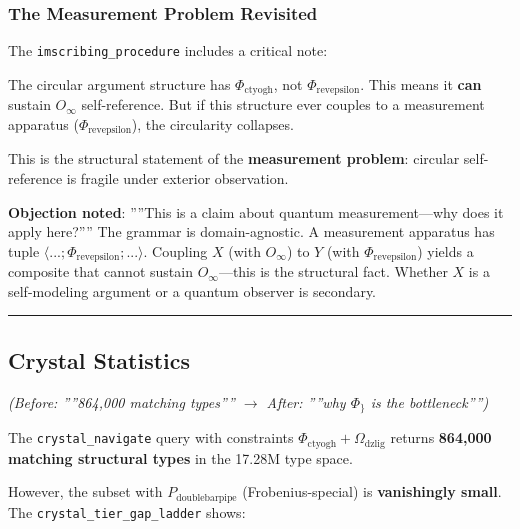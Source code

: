 \documentclass[12pt,a4paper]{article}
\begin{document}
\subsubsection{The Measurement Problem Revisited}

The \texttt{imscribing\_procedure} includes a critical note:

\begin{quote}
\end{quote}

The circular argument structure has $\Phi_{\text{ctyogh}}$, not $\Phi_{\text{revepsilon}}$. This means it \textbf{can} sustain $O_{\infty}$ self-reference. But if this structure ever couples to a measurement apparatus ($\Phi_{\text{revepsilon}}$), the circularity collapses.

This is the structural statement of the \textbf{measurement problem}: circular self-reference is fragile under exterior observation.

\textbf{Objection noted}: ''''This is a claim about quantum measurement---why does it apply here?'''' The grammar is domain-agnostic. A measurement apparatus has tuple $\langle ...; \Phi_{\text{revepsilon}}; ... \rangle$. Coupling $X$ (with $O_{\infty}$) to $Y$ (with $\Phi_{\text{revepsilon}}$) yields a composite that cannot sustain $O_{\infty}$---this is the structural fact. Whether $X$ is a self-modeling argument or a quantum observer is secondary.

\begin{center}
\rule{0.5\textwidth}{0.4pt}
\end{center}

\subsection{Crystal Statistics}

\emph{(Before: ''''864,000 matching types'''' $\rightarrow$ After: ''''why $\Phi_{\}}$ is the bottleneck'''')}

The \texttt{crystal\_navigate} query with constraints $\Phi_{\text{ctyogh}} + \Omega_{\text{dzlig}}$ returns \textbf{864,000 matching structural types} in the 17.28M type space.

However, the subset with \textbf{$P_{\text{doublebarpipe}}$} (Frobenius-special) is \textbf{vanishingly small}. The \texttt{crystal\_tier\_gap\_ladder} shows:

\begin{quote}
\end{quote}
\end{document}
